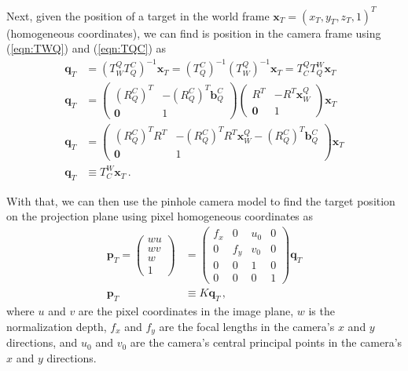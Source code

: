 \documentclass[11pt]{article}
\begin{document}
Next, given the position of a target in the world frame $\mathbf x_T=(x_T,y_T,z_T,1)^T$ (homogeneous coordinates), we can find is position in the camera frame using (\ref{eqn:TWQ}) and (\ref{eqn:TQC}) as
\begin{align}
    \mathbf q_T&=(T_W^QT_Q^C)^{-1}\mathbf x_T=(T_Q^C)^{-1}(T_W^Q)^{-1}\mathbf x_T=T_C^QT_Q^W\mathbf x_T\nonumber\\
    \mathbf q_T&=\begin{pmatrix}
        (R_Q^C)^T & -(R_Q^C)^T\mathbf b_Q^C\\\mathbf0 & 1
    \end{pmatrix}\begin{pmatrix}
        R^T & -R^T\mathbf x_W^Q\\\mathbf0 & 1
    \end{pmatrix}\mathbf x_T\nonumber\\
    \mathbf q_T&=\begin{pmatrix}
        (R_Q^C)^TR^T & -(R_Q^C)^TR^T\mathbf x_W^Q-(R_Q^C)^T\mathbf b_Q^C\\\mathbf0 & 1
    \end{pmatrix}\mathbf x_T\nonumber\\
    \mathbf q_T&\equiv T_C^W\mathbf x_T\,.\label{eqn:qT}
\end{align}

With that, we can then use the pinhole camera model to find the target position on the projection plane using pixel homogeneous coordinates as
\begin{align}
    \mathbf p_T=\begin{pmatrix}
        wu\\wv\\w\\1
    \end{pmatrix}&=\begin{pmatrix}
        f_x & 0 & u_0 & 0\\
        0 & f_y & v_0 & 0\\
        0 & 0 & 1 & 0\\
        0 & 0 & 0 & 1
    \end{pmatrix}\mathbf q_T\nonumber\\
    \mathbf p_T&\equiv K\mathbf q_T\,,\label{eqn:pT}
\end{align}
where $u$ and $v$ are the pixel coordinates in the image plane, $w$ is the normalization depth, $f_x$ and $f_y$ are the focal lengths in the camera's $x$ and $y$ directions, and $u_0$ and $v_0$ are the camera's central principal points in the camera's $x$ and $y$ directions.
\end{document}
